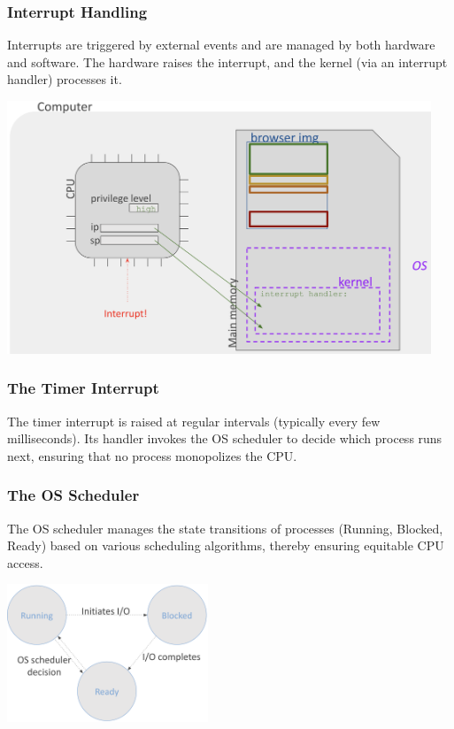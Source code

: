 \begin{minipage}[htp]{0.45\textwidth}
\subsubsection*{Interrupt Handling}
Interrupts are triggered by external events and are managed by both hardware and software. The hardware raises the interrupt, and the kernel (via an interrupt handler) processes it.
\vspace{8px}
\begin{center} 
  \includegraphics[width=0.95\textwidth]{chapters/L3/images/interrupt.png}
\end{center}
\end{minipage}

\subsubsection{The Timer Interrupt}
\begin{definition}
The timer interrupt is raised at regular intervals (typically every few milliseconds). Its handler invokes the OS scheduler to decide which process runs next, ensuring that no process monopolizes the CPU.
\end{definition}
\vspace{15px}
\newpage
\subsubsection{The OS Scheduler}
The OS scheduler manages the state transitions of processes (Running, Blocked, Ready) based on various scheduling algorithms, thereby ensuring equitable CPU access.

\begin{center}
  \includegraphics[width=0.45\textwidth]{chapters/L3/images/os-scheduler.png}
\end{center}

